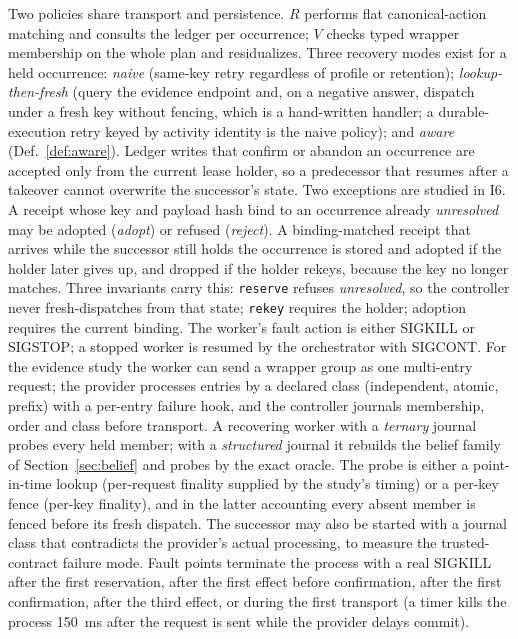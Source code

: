 \documentclass[conference,10pt]{IEEEtran}
\begin{document}
Two policies share transport and persistence. $R$ performs flat canonical-action matching and consults the ledger per occurrence; $V$ checks typed wrapper membership on the whole plan and residualizes. Three recovery modes exist for a held occurrence: \emph{naive} (same-key retry regardless of profile or retention); \emph{lookup-then-fresh} (query the evidence endpoint and, on a negative answer, dispatch under a fresh key without fencing, which is a hand-written handler; a durable-execution retry keyed by activity identity is the naive policy); and \emph{aware} (Def.~\ref{def:aware}). Ledger writes that confirm or abandon an occurrence are accepted only from the current lease holder, so a predecessor that resumes after a takeover cannot overwrite the successor's state. Two exceptions are studied in I6. A receipt whose key and payload hash bind to an occurrence already \emph{unresolved} may be adopted (\emph{adopt}) or refused (\emph{reject}). A binding-matched receipt that arrives while the successor still holds the occurrence is stored and adopted if the holder later gives up, and dropped if the holder rekeys, because the key no longer matches. Three invariants carry this: \texttt{reserve} refuses \emph{unresolved}, so the controller never fresh-dispatches from that state; \texttt{rekey} requires the holder; adoption requires the current binding. The worker's fault action is either SIGKILL or SIGSTOP; a stopped worker is resumed by the orchestrator with SIGCONT. For the evidence study the worker can send a wrapper group as one multi-entry request; the provider processes entries by a declared class (independent, atomic, prefix) with a per-entry failure hook, and the controller journals membership, order and class before transport. A recovering worker with a \emph{ternary} journal probes every held member; with a \emph{structured} journal it rebuilds the belief family of Section~\ref{sec:belief} and probes by the exact oracle. The probe is either a point-in-time lookup (per-request finality supplied by the study's timing) or a per-key fence (per-key finality), and in the latter accounting every absent member is fenced before its fresh dispatch. The successor may also be started with a journal class that contradicts the provider's actual processing, to measure the trusted-contract failure mode. Fault points terminate the process with a real SIGKILL after the first reservation, after the first effect before confirmation, after the first confirmation, after the third effect, or during the first transport (a timer kills the process 150~ms after the request is sent while the provider delays commit).
\end{document}
